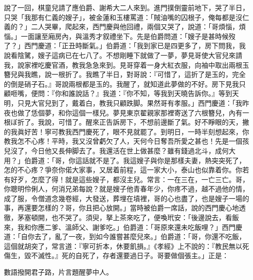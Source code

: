 說了一回，棋童兒請了應伯爵、謝希大二人來到。進門撲倒靈前地下，{}哭了半日，只哭「我那有仁義的嫂子」，{}被金蓮和玉樓罵道：「賊油嘴的囚根子，俺每都是沒仁義的？」二人哭畢，爬起來，西門慶與他回禮，兩個又哭了，說道：「哥煩惱，煩惱。」一面讓至廂房內，與溫秀才叙禮坐下。先是伯爵問道：「嫂子是甚時候歿了？」西門慶道：「正丑時斷氣。」伯爵道：「我到家已是四更多了，房下問我，我說看陰騭，嫂子這病已在七八了。不想剛睡下就做了一夢，{}夢見哥使大官兒來請我，說家裡吃慶官酒，教我急急來到。見哥穿着一身大紅衣服，向袖中取出兩根玉簪兒與我瞧，說一根折了。我瞧了半日，對哥說：『可惜了，這折了是玉的，完全的倒是硝子石。』{}哥說兩根都是玉的。{}我醒了，就知道此夢做的不好。房下見我只顧咂嘴，便問：『你和誰說話？』我道：『你不知，等我到天曉告訴你。』等到天明，只見大官兒到了，戴着白，教我只顧跌脚。{}果然哥有孝服。」西門慶道：「我昨夜也做了恁個夢，和你這個一樣兒。夢見東京翟親家那裡寄送了六根簪兒，內有一根ぼ折了。我說，可惜了。醒來正告訴房下，不想前邊斷了氣。好不睜眼的天，{}撇的我眞好苦！寧可教我西門慶死了，眼不見就罷了。到明日，一時半刻想起來，你教我怎不心疼！平時，我又沒曾虧欠了人，{}天何今日奪吾所愛之甚也！先是一個孩兒沒了，今日他又長伸脚去了。我還活在世上做甚麼？雖有錢過北斗，成何大用？」伯爵道：「哥，你這話就不是了。我這嫂子與你是那樣夫妻，熱突突死了，怎的不心疼？爭奈你偌大家事，又居着前程，這一家大小，泰山也似靠着你。你若有好歹，怎麼了得！就是這些嫂子，都沒主兒。常言：一在三在，一亡三亡。哥，你聰明伶俐人，何消兄弟每說？就是嫂子他青春年少，你疼不過，越不過他的情，成了服，令僧道念幾卷經，大發送，葬埋在墳裡，哥的心也盡了，也是嫂子一場的事，再還要怎樣的？哥，你且把心放開。」{}當時被伯爵一席話，說的西門慶心地透徹，茅塞頓開，也不哭了。須臾，拏上茶來吃了，便喚玳安：「後邊說去，看飯來，我和你應二爹、溫師父、謝爹吃。」伯爵道：「哥原來還未吃飯哩？」西門慶道：「自你去了，亂了一夜，到如今誰嘗甚麼兒來。」伯爵道：「哥，你還不吃飯，這個就胡突了，常言道：『寧可折本，休要飢損。』《孝經》上不說的：『教民無以死傷生，毀不滅性。』{}死的自死了，存者還要過日子。哥要做個張主。」正是：

\begin{myquote} 
數語撥開君子路，片言題醒夢中人。
\end{myquote} 

